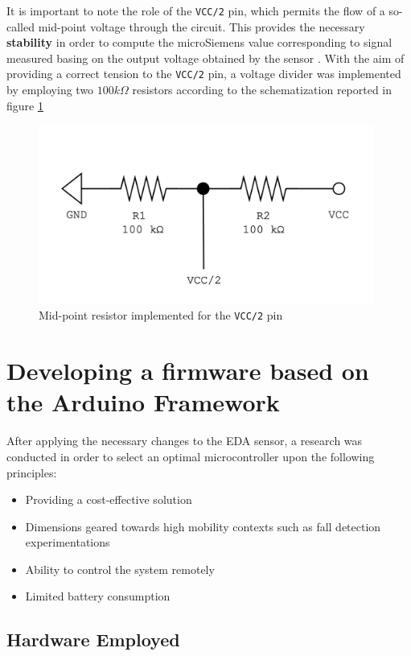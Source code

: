 It is important to note the role of the \texttt{VCC/2} pin, which permits the flow of a so-called mid-point voltage through the circuit. This provides the necessary \textbf{stability} in order to compute the microSiemens value corresponding to signal measured basing on the output voltage obtained by the sensor \cite{bitalino-midpoint-voltage}. With the aim of providing a correct tension to the \texttt{VCC/2} pin, a voltage divider was implemented by employing two $100 k\Omega$ resistors according to the schematization reported in figure \ref{fig:voltage-divider-schema} 
\begin{figure}
    \centering
    \includegraphics[width=11cm]{./images/midpoint-resistor.drawio.png}
    \caption{Mid-point resistor implemented for the \texttt{VCC/2} pin}
    \label{fig:voltage-divider-schema}
\end{figure}

\section{Developing a firmware based on the Arduino Framework}\label{sec:firmware}

After applying the necessary changes to the EDA sensor, a research was conducted in order to select an optimal microcontroller upon the following principles: 

\begin{itemize}
    \item Providing a cost-effective solution
    \item Dimensions geared towards high mobility contexts such as fall detection experimentations
    \item Ability to control the system remotely
    \item Limited battery consumption
\end{itemize}

\subsection{Hardware Employed}\label{sec:hardware-employed}

